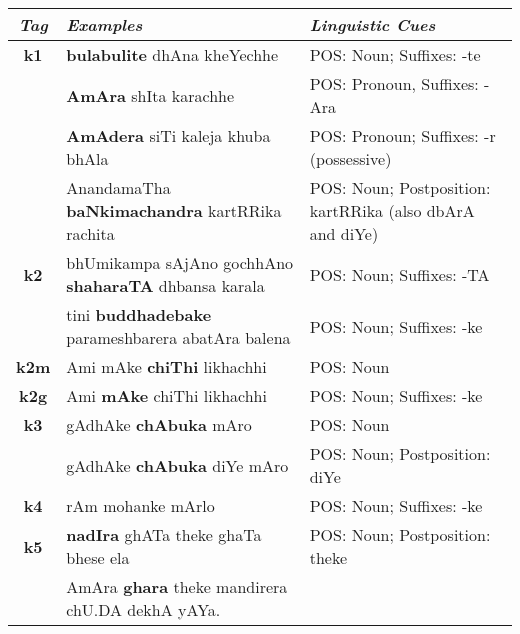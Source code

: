 \documentclass[a4 paper]{article}
\begin{document}
\begin{longtable}{cp{}p{}}
    \toprule
    \textit{Tag} & \textit{Examples} & \textit{Linguistic Cues} \\ 
    \toprule
    \addlinespace[0.5em]
    \textbf{k1}
                 & \textbf{bulabulite} dhAna kheYechhe
                 & POS: Noun; Suffixes: -te\\
    \addlinespace[0.5em]
                 & \textbf{AmAra} shIta karachhe
                 & POS: Pronoun, Suffixes: -Ara\\
    \addlinespace[0.5em]
                 & \textbf{AmAdera} siTi kaleja khuba bhAla
                 & POS: Pronoun; Suffixes: -r (possessive)\\
    \addlinespace[0.5em]
                 & AnandamaTha \textbf{baNkimachandra} kartRRika rachita
                 & POS: Noun; Postposition: kartRRika (also dbArA and diYe)\\
    \midrule
    \addlinespace[0.5em]
    \textbf{k2}
                 & bhUmikampa sAjAno gochhAno \textbf{shaharaTA} dhbansa karala
                 & POS: Noun; Suffixes: -TA\\
    \addlinespace[0.5em]
                 & tini \textbf{buddhadebake} parameshbarera abatAra balena
                 & POS: Noun; Suffixes: -ke\\
    \midrule
    \addlinespace[0.5em]
    \textbf{k2m}
                 & Ami mAke \textbf{chiThi} likhachhi
                 & POS: Noun\\
    \midrule
    \addlinespace[0.5em]
    \textbf{k2g}
                 & Ami \textbf{mAke} chiThi likhachhi
                 & POS: Noun; Suffixes: -ke\\
    \midrule
    \addlinespace[0.5em]
    \textbf{k3}
                 & gAdhAke \textbf{chAbuka} mAro
                 & POS: Noun\\
    \addlinespace[0.5em]
                 & gAdhAke \textbf{chAbuka} diYe mAro
                 & POS: Noun; Postposition: diYe\\
    \midrule
    \addlinespace[0.5em]
    \textbf{k4}
                 & rAm mohanke mArlo
                 & POS: Noun; Suffixes: -ke\\
    \midrule
    \addlinespace[0.5em]
    \textbf{k5}
                 & \textbf{nadIra} ghATa theke ghaTa bhese ela
                 & POS: Noun; Postposition: theke\\
    \addlinespace[0.5em]
                 & AmAra \textbf{ghara} theke mandirera chU.DA dekhA yAYa.

\end{longtable}
\end{document}
